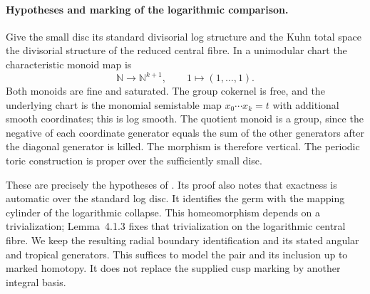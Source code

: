 \paragraph{Hypotheses and marking of the logarithmic comparison.}
\label{mapsF:repair:log-cylinder-scope}
Give the small disc its standard divisorial log structure and
the Kuhn total space the divisorial structure of the reduced
central fibre.  In a unimodular chart the characteristic
monoid map is
\[
 \mathbb N\longrightarrow\mathbb N^{k+1},\qquad
 1\longmapsto(1,\ldots,1).
\]
Both monoids are fine and saturated.  The group cokernel is
free, and the underlying chart is the monomial semistable
map $x_0\cdots x_k=t$ with additional smooth coordinates;
this is log smooth.  The quotient monoid is a group, since
the negative of each coordinate generator equals the sum of
the other generators after the diagonal generator is killed.
The morphism is therefore vertical.  The periodic toric
construction is proper over the sufficiently small disc.

These are precisely the hypotheses of
\cite[Theorem~4.1.1, pp.~480--482]{ffAchingerOgus20}.
Its proof also notes that exactness is automatic over the
standard log disc.  It identifies the germ with the mapping
cylinder of the logarithmic collapse.  This homeomorphism
depends on a trivialization; Lemma~4.1.3 fixes that
trivialization on the logarithmic central fibre.  We keep
the resulting radial boundary identification and its stated
angular and tropical generators.  This suffices to model
the pair and its inclusion up to marked homotopy.  It does
not replace the supplied cusp marking by another integral
basis.
